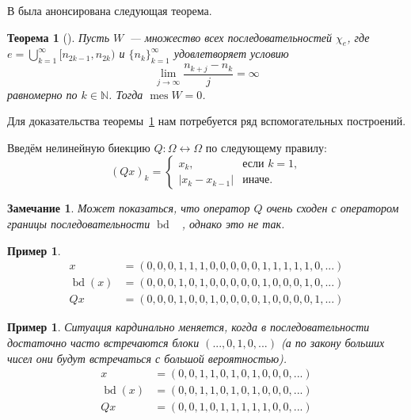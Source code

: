 \documentclass[a4paper,14pt]{article} %
\theoremstyle{plain}
\newtheorem{theorem}[lemma]{Теорема}
\newtheorem{example}[lemma]{Пример}
\newtheorem{remark}[lemma]{Замечание}
\begin{document}

В \cite{our-mz2019measure} была анонсирована следующая теорема.
\begin{theorem}[{\cite[Теорема 2]{our-mz2019measure}}]
	\label{thm:mes_W}
	Пусть $W$~--- множество всех последовательностей $\chi_e$, где $e =\bigcup_{k=1}^{\infty} [n_{2k-1}, n_{2k} )$
	и $\{n_k \}_{k=1}^{\infty}$
	удовлетворяет условию
	\begin{equation}
		\label{eq:lim_j_n_kj_measure}
		\lim_{j\to\infty}\frac{n_{k+j} - n_k}{j} = \infty
	\end{equation}
	равномерно по $k \in \mathbb{N}$.
	Тогда $\operatorname{mes} W = 0$.
\end{theorem}

Для доказательства теоремы~\ref{thm:mes_W} нам потребуется ряд вспомогательных построений.


Введём нелинейную биекцию $Q:\Omega\leftrightarrow\Omega$ по следующему правилу:
\begin{equation}
	(Qx)_k = \begin{cases}
		x_k, &\mbox{если~} k = 1,
		\\
		|x_k-x_{k-1}|&\mbox{иначе}.
	\end{cases}
\end{equation}

\begin{remark}
	Может показаться, что оператор $Q$ очень сходен с оператором границы последовательности $\operatorname{bd}$
	~\cite{keller1992invariant},
	однако это не так.
\end{remark}

\begin{example}
	\begin{equation}
		\begin{array}{rl}
			                   x &= (0,0,0,1,1,1,0,0,0,0,0,1,1,1,1,1,0,...)
			\\
			\operatorname{bd}(x) &= (0,0,0,1,0,1,0,0,0,0,0,1,0,0,0,1,0,...)
			\\
			                  Qx &= (0,0,0,1,0,0,1,0,0,0,0,1,0,0,0,0,1,...)
		\end{array}
	\end{equation}
\end{example}

\begin{example}
	Ситуация кардинально меняется, когда в последовательности достаточно часто встречаются блоки $(...,0,1,0,...)$
	(а по закону больших чисел они будут встречаться с большой вероятностью).
	\begin{equation}
		\begin{array}{rl}
			                   x &= (0,0,1,1,0,1,0,1,0,0,0,...)
			\\
			\operatorname{bd}(x) &= (0,0,1,1,0,1,0,1,0,0,0,...)
			\\
			                  Qx &= (0,0,1,0,1,1,1,1,1,0,0,...)
		\end{array}
	\end{equation}
\end{example}
\end{document}
